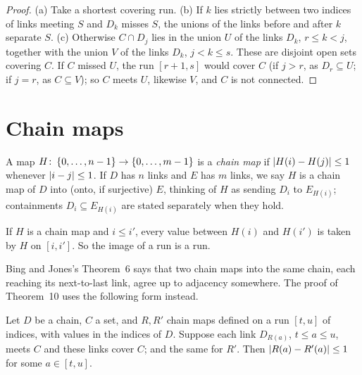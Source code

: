 \begin{proof}
(a) Take a shortest covering run. (b) If $k$ lies strictly between two indices of links meeting $S$ and $D_k$ misses $S$, the unions of the links before and
after $k$ separate $S$. (c) Otherwise $C\cap D_j$ lies in the union $U$ of the links $D_k$, $r\le k<j$, together with the union $V$ of the links $D_k$,
$j<k\le s$. These are disjoint open sets covering $C$. If $C$ missed $U$, the run $[r+1,s]$ would cover $C$ (if $j>r$, as $D_r\subseteq U$; if $j=r$, as $C\subseteq
V$); so $C$ meets $U$, likewise $V$, and $C$ is not connected.
\end{proof}


\section{Chain maps}

\begin{definition}\label{def:chainmap}
A map $H\colon\left\{ 0,\dots,n-1 \right\}\to\left\{ 0,\dots,m-1 \right\}$ is a \emph{chain map} if $\left\lvert H(i)-H(j)\right\rvert\le1$ whenever $\left\lvert i-j\right\rvert\le1$. If $D$ has $n$ links and $E$ has
$m$ links, we say $H$ is a chain map of $D$ into (onto, if surjective) $E$, thinking of $H$ as sending $D_i$ to $E_{H(i)}$; containments $D_i\subseteq
E_{H(i)}$ are stated separately when they hold.
\end{definition}


\begin{lemma}\label{lem:chainmap-ivt}
If $H$ is a chain map and $i\le i'$, every value between $H(i)$ and $H(i')$ is taken by $H$ on $[i,i']$. So the image of a run is a run.
\end{lemma}


Bing and Jones's Theorem~6 says that two chain maps into the same chain, each reaching its next-to-last link, agree up to adjacency somewhere. The proof
of Theorem~10 uses the following form instead.

\begin{theorem}\label{thm:bj6}
Let $D$ be a chain, $C$ a set, and $R,R'$ chain maps defined on a run $[t,u]$ of indices, with values in the indices of $D$. Suppose each link $D_{R(a)}$,
$t\le a\le u$, meets $C$ and these links cover $C$; and the same for $R'$. Then $\left\lvert R(a)-R'(a)\right\rvert\le1$ for some $a\in[t,u]$.
\end{theorem}

